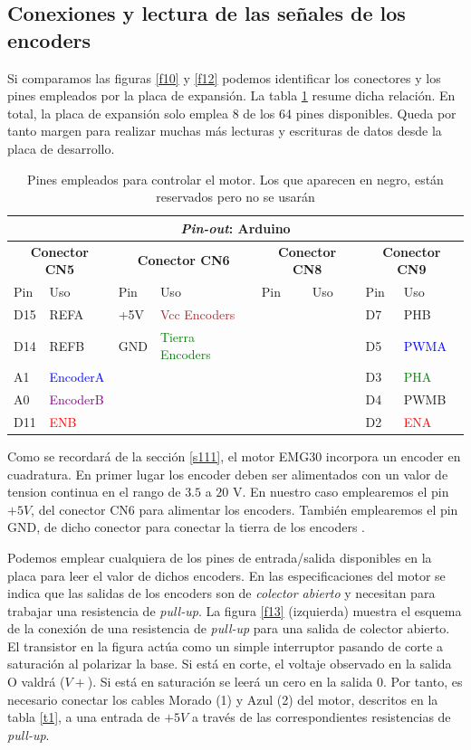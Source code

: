 \documentclass[10pt,a4paper]{report}
\begin{document}
\subsection{Conexiones y lectura de las señales de los encoders}
Si comparamos las figuras \ref{f10} y \ref{f12} podemos identificar los conectores y los pines empleados por la placa de expansión. La tabla \ref{t2} resume dicha relación.
En total, la placa de expansión solo emplea 8 de los 64 pines disponibles. Queda por tanto margen para realizar muchas más lecturas y escrituras de datos desde la placa de desarrollo. 
\begin{table}
\centering
\begin{tabular}{|l l| l l |l l| l l|}
\multicolumn{8}{c}{\emph{Pin-out}: Arduino}\\
\hline
\multicolumn{2}{|c|}{\textbf{Conector CN5}}&\multicolumn{2}{c|}{\textbf{Conector CN6}}&\multicolumn{2}{c|}{\textbf{Conector CN8}}&\multicolumn{2}{c|}{\textbf{Conector CN9}}\\
Pin  & Uso & Pin  & Uso & Pin  & Uso & Pin  & Uso\\
\hline
D15 & REFA & +5V& \textcolor{brown}{Vcc Encoders} & & & D7&  PHB\\
D14 &REFB & GND& \textcolor{green}{Tierra Encoders}& & & D5 & \textcolor{blue}{PWMA}\\
A1 &\textcolor{blue}{EncoderA}& & & & & D3 & \textcolor{green}{PHA}\\
A0&\textcolor{purple}{EncoderB}& & & & & D4 & PWMB \\
D11 & \textcolor{red}{ENB} & & & & &D2 & \textcolor{red}{ENA}\\
\hline
\end{tabular}
\caption{Pines empleados para controlar el motor. Los que aparecen en negro, están reservados pero no se usarán}\label{t2}
\end{table}

Como se recordará de la sección \ref{s111}, el motor EMG30 incorpora un encoder en cuadratura. En primer lugar los encoder deben ser alimentados con un valor de tension continua en el rango de $3.5$ a $20$ V. En nuestro caso emplearemos el pin $+5V$, del conector CN6 para alimentar los encoders. También emplearemos el pin GND, de dicho conector para conectar la tierra de los encoders . 

Podemos emplear cualquiera de los pines de entrada/salida disponibles en la placa para leer el valor de dichos encoders. En las especificaciones del motor \cite{EMG30} se indica que las salidas de los encoders son de \emph{colector abierto} y necesitan para trabajar una resistencia de \emph{pull-up}.  La figura \ref{f13} (izquierda) muestra el esquema de la conexión de una resistencia de \emph{pull-up} para una salida de colector abierto. El transistor en la figura actúa como un simple interruptor pasando de corte a saturación al polarizar la base. Si está en corte, el voltaje observado en la salida O valdrá ($V+$). Si está en saturación se leerá un cero en la salida $0$. Por tanto, es necesario conectar los cables Morado (1) y Azul (2) del motor,  descritos en la tabla \ref{t1}, a una entrada de $+5V$  a través de las correspondientes resistencias de \emph{pull-up}.
\end{document}
